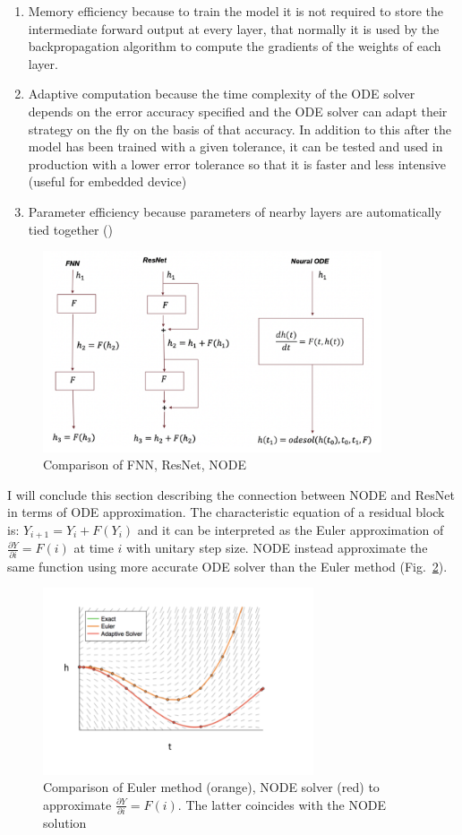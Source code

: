 \documentclass[LaM,binding=0.6cm]{sapthesis}
\begin{document}
\begin{enumerate}
\item Memory efficiency because to train the model it is not required to store the intermediate forward output at every layer, that normally it is used by the backpropagation algorithm to compute the gradients of the weights of each layer.
\item Adaptive computation because the time complexity of the ODE solver depends on the error accuracy specified and the ODE solver can adapt their strategy on the fly on the basis of that accuracy.  In addition to this after the model has been trained with a given tolerance, it can be tested and used in production with a lower error tolerance so that it is faster and less intensive (useful for embedded device)
\item Parameter efficiency because parameters of nearby layers are automatically tied together (\cite{DBLP:journals/corr/abs-1806-07366})
\end{enumerate}
\begin{figure}[H]  \centering
    \includegraphics[width=100mm,scale=0.7]{cmplink.png}
    \caption{Comparison of FNN, ResNet, NODE}
    \label{fig:cmplink}
\end{figure}
I will conclude this section describing the connection between NODE and ResNet in terms of ODE approximation. The characteristic equation of a residual block is: $Y_{i+1} = Y_{i} +F(Y_{i})$ and it can be interpreted as the Euler approximation of $\frac{\partial Y}{\partial i} = F(i)$ at time $i$ with unitary step size. NODE instead approximate the same function using more accurate ODE solver than the Euler method (Fig.~\ref{fig:eulermethod}). 
\begin{figure}[H]  \centering
    \includegraphics[width=80mm,scale=0.7]{eulermethod.png}
    \caption{Comparison of Euler method (orange), NODE solver (red) to approximate  $\frac{\partial Y}{\partial i} = F(i)$. The latter coincides with the NODE solution }
    \label{fig:eulermethod}
\end{figure}
\end{document}
